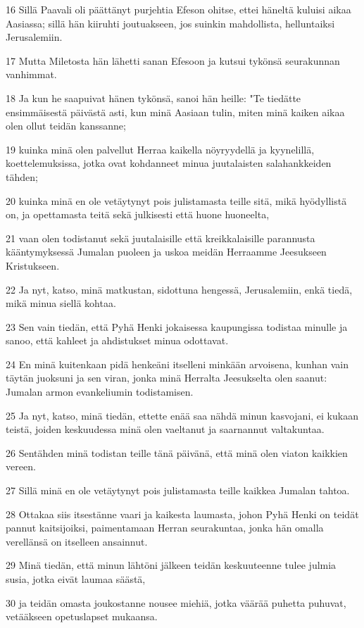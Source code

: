 \par 16 Sillä Paavali oli päättänyt purjehtia Efeson ohitse, ettei häneltä kuluisi aikaa Aasiassa; sillä hän kiiruhti joutuakseen, jos suinkin mahdollista, helluntaiksi Jerusalemiin.
\par 17 Mutta Miletosta hän lähetti sanan Efesoon ja kutsui tykönsä seurakunnan vanhimmat.
\par 18 Ja kun he saapuivat hänen tykönsä, sanoi hän heille: "Te tiedätte ensimmäisestä päivästä asti, kun minä Aasiaan tulin, miten minä kaiken aikaa olen ollut teidän kanssanne;
\par 19 kuinka minä olen palvellut Herraa kaikella nöyryydellä ja kyynelillä, koettelemuksissa, jotka ovat kohdanneet minua juutalaisten salahankkeiden tähden;
\par 20 kuinka minä en ole vetäytynyt pois julistamasta teille sitä, mikä hyödyllistä on, ja opettamasta teitä sekä julkisesti että huone huoneelta,
\par 21 vaan olen todistanut sekä juutalaisille että kreikkalaisille parannusta kääntymyksessä Jumalan puoleen ja uskoa meidän Herraamme Jeesukseen Kristukseen.
\par 22 Ja nyt, katso, minä matkustan, sidottuna hengessä, Jerusalemiin, enkä tiedä, mikä minua siellä kohtaa.
\par 23 Sen vain tiedän, että Pyhä Henki jokaisessa kaupungissa todistaa minulle ja sanoo, että kahleet ja ahdistukset minua odottavat.
\par 24 En minä kuitenkaan pidä henkeäni itselleni minkään arvoisena, kunhan vain täytän juoksuni ja sen viran, jonka minä Herralta Jeesukselta olen saanut: Jumalan armon evankeliumin todistamisen.
\par 25 Ja nyt, katso, minä tiedän, ettette enää saa nähdä minun kasvojani, ei kukaan teistä, joiden keskuudessa minä olen vaeltanut ja saarnannut valtakuntaa.
\par 26 Sentähden minä todistan teille tänä päivänä, että minä olen viaton kaikkien vereen.
\par 27 Sillä minä en ole vetäytynyt pois julistamasta teille kaikkea Jumalan tahtoa.
\par 28 Ottakaa siis itsestänne vaari ja kaikesta laumasta, johon Pyhä Henki on teidät pannut kaitsijoiksi, paimentamaan Herran seurakuntaa, jonka hän omalla verellänsä on itselleen ansainnut.
\par 29 Minä tiedän, että minun lähtöni jälkeen teidän keskuuteenne tulee julmia susia, jotka eivät laumaa säästä,
\par 30 ja teidän omasta joukostanne nousee miehiä, jotka väärää puhetta puhuvat, vetääkseen opetuslapset mukaansa.
